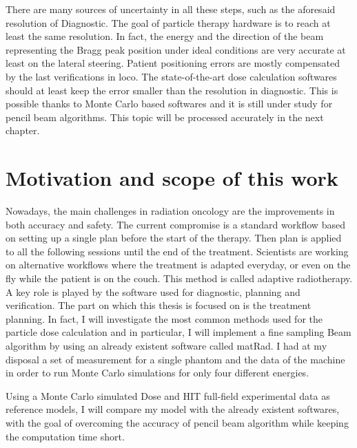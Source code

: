 \documentclass[12pt, a4paper, twoside]{book}
\begin{document}
There are many sources of uncertainty in all these steps, such as the aforesaid resolution of Diagnostic. The goal of particle therapy hardware is to reach at least the same resolution. In fact, the energy and the direction of the beam representing the Bragg peak position under ideal conditions are very accurate at least on the lateral steering.
Patient positioning errors are mostly compensated by the last verifications in loco.
The state-of-the-art dose calculation softwares should at least keep the error smaller than the resolution in diagnostic. This is possible thanks to Monte Carlo based softwares and it is still under study for pencil beam algorithms. This topic will be processed accurately in the next chapter.



\section{Motivation and scope of this work} 
Nowadays, the main challenges in radiation oncology are the improvements in both accuracy and safety. 
The current compromise is a standard workflow based on setting up a single plan before the start of the therapy. Then plan is applied to all the following sessions until the end of the treatment.
Scientists are working on alternative workflows where the treatment is adapted everyday, or even on the fly while the patient is on the couch. This method is called adaptive radiotherapy.
A key role is played by the software used for diagnostic, planning and verification.
The part on which this thesis is focused on is the treatment planning. In fact, I will investigate the most common methods used for the particle dose calculation and in particular, I will implement a fine sampling Beam algorithm by using an already existent software called matRad. 
I had at my disposal a set of measurement for a single phantom and the data of the machine in order to run Monte Carlo simulations for only four different energies.

Using a Monte Carlo simulated Dose and HIT full-field experimental data as reference models, I will compare my model with the already existent softwares, with the goal of overcoming the accuracy of pencil beam algorithm while keeping the computation time short.  
\end{document}

